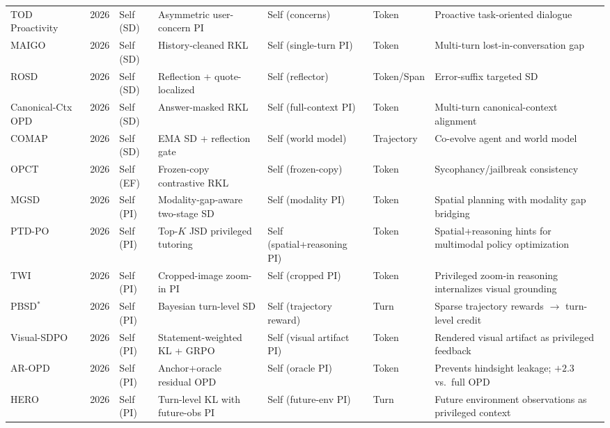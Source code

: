 \documentclass{article} %
\begin{document}
\begin{table}[t]
{\begin{tabular}{@{}lclllll@{}}
        TOD Proactivity~\citep{2605.22240} & 2026 & Self (SD) & Asymmetric user-concern PI & Self (concerns) & Token & Proactive task-oriented dialogue \\
        MAIGO~\citep{2605.27186} & 2026 & Self (SD) & History-cleaned RKL & Self (single-turn PI) & Token & Multi-turn lost-in-conversation gap \\
        ROSD~\citep{2605.28014} & 2026 & Self (SD) & Reflection + quote-localized & Self (reflector) & Token/Span & Error-suffix targeted SD \\
        Canonical-Ctx OPD~\citep{2605.30251} & 2026 & Self (SD) & Answer-masked RKL & Self (full-context PI) & Token & Multi-turn canonical-context alignment \\
        COMAP~\citep{2606.02372} & 2026 & Self (SD) & EMA SD + reflection gate & Self (world model) & Trajectory & Co-evolve agent and world model \\
        OPCT~\citep{2605.21834} & 2026 & Self (EF) & Frozen-copy contrastive RKL & Self (frozen-copy) & Token & Sycophancy/jailbreak consistency \\
        MGSD~\citep{2606.06076} & 2026 & Self (PI) & Modality-gap-aware two-stage SD & Self (modality PI) & Token & Spatial planning with modality gap bridging \\
        PTD-PO~\citep{2606.07000} & 2026 & Self (PI) & Top-$K$ JSD privileged tutoring & Self (spatial+reasoning PI) & Token & Spatial+reasoning hints for multimodal policy optimization \\
        TWI~\citep{2606.08719} & 2026 & Self (PI) & Cropped-image zoom-in PI & Self (cropped PI) & Token & Privileged zoom-in reasoning internalizes visual grounding \\
        PBSD$^*$ \citep{2606.09348} & 2026 & Self (PI) & Bayesian turn-level SD & Self (trajectory reward) & Turn & Sparse trajectory rewards $\to$ turn-level credit \\
        Visual-SDPO~\citep{2606.10334} & 2026 & Self (PI) & Statement-weighted KL + GRPO & Self (visual artifact PI) & Token & Rendered visual artifact as privileged feedback \\
        AR-OPD~\citep{2606.10385} & 2026 & Self (PI) & Anchor+oracle residual OPD & Self (oracle PI) & Token & Prevents hindsight leakage; $+2.3$ vs.\ full OPD \\
        HERO~\citep{2606.11559} & 2026 & Self (PI) & Turn-level KL with future-obs PI & Self (future-env PI) & Turn & Future environment observations as privileged context \\

\end{tabular}}
\end{table}
\end{document}

